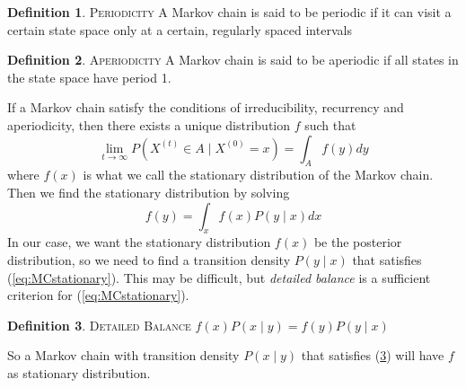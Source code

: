 \documentclass{article}
\theoremstyle{definition}
\newtheorem{definition}{Definition}[section]
\begin{document}
\begin{definition}{\textsc{Periodicity}} 
A Markov chain is said to be periodic if it can visit a certain state space only at a certain, regularly spaced intervals
\end{definition}
\theoremstyle{definition}
\begin{definition}{\textsc{Aperiodicity}}
A Markov chain is said to be aperiodic if all states in the state space have period 1. 
\end{definition}
If a Markov chain satisfy the conditions of irreducibility, recurrency and aperiodicity, then there exists a unique  distribution $f$ such that
\begin{equation*}
\lim_{t\xrightarrow{}\infty}P\left(X^{(t)}\in A\mid X^{(0)} = x\right) = \int_{A} f\left(y\right) dy
\end{equation*}
where $f\left(x\right)$ is what we call the stationary distribution of the Markov chain. Then we find the stationary distribution by solving 
\begin{equation}\label{eq:MCstationary}
    f(y) = \int_x f(x) P(y\mid x) dx 
\end{equation}In our case, we want the stationary distribution $f(x)$ be the posterior distribution, so we need to find a transition density  $P\left(y\mid x\right)$ that satisfies (\ref{eq:MCstationary}). This may be difficult, but \textit{detailed balance} is a sufficient criterion for (\ref{eq:MCstationary}). 
\theoremstyle{definition}
\begin{definition}{\textsc{Detailed Balance}} \label{def:detailed_balance}
   $ f(x)P\left(x\mid y\right) = f(y)P\left(y\mid x\right)$
\end{definition}
So a Markov chain with transition density $P\left(x\mid y\right)$ that satisfies (\ref{def:detailed_balance}) will have $f$ as stationary distribution. 
\end{document}
